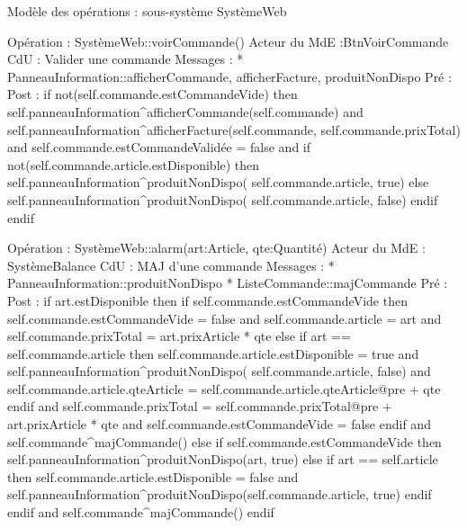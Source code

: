 ﻿Modèle des opérations : sous-système SystèmeWeb






Opération : SystèmeWeb::voirCommande()
Acteur du MdE :BtnVoirCommande
CdU : Valider une commande
Messages : 
* PanneauInformation::{afficherCommande, afficherFacture, produitNonDispo}
Pré :
Post : 
        if not(self.commande.estCommandeVide) then
                self.panneauInformation^afficherCommande(self.commande) 
                and
                self.panneauInformation^afficherFacture(self.commande, self.commande.prixTotal) 
                and
                self.commande.estCommandeValidée = false 
                and
                if not(self.commande.article.estDisponible) then
                        self.panneauInformation^produitNonDispo( self.commande.article, true)
                else
                        self.panneauInformation^produitNonDispo( self.commande.article, false)
                endif
        endif



Opération : SystèmeWeb::alarm(art:Article, qte:Quantité)
Acteur du MdE : SystèmeBalance
CdU : MAJ d’une commande
Messages :
* PanneauInformation::{produitNonDispo} 
* ListeCommande::{majCommande}
Pré :
Post :  
        if art.estDisponible then
                if self.commande.estCommandeVide then
                        self.commande.estCommandeVide = false 
                        and
                        self.commande.article = art 
                        and
                        self.commande.prixTotal = art.prixArticle * qte
                else
                        if art == self.commande.article then 
                                self.commande.article.estDisponible = true 
                                and 
                                self.panneauInformation^produitNonDispo( self.commande.article, false) 
                                and
                                self.commande.article.qteArticle = self.commande.article.qteArticle@pre + qte
                        endif
                        and
                        self.commande.prixTotal = self.commande.prixTotal@pre + art.prixArticle * qte
                        and
                        self.commande.estCommandeVide = false
                endif
                and
                self.commande^majCommande()
        else
                if self.commande.estCommandeVide then
                        self.panneauInformation^produitNonDispo(art, true)
                else
                        if art == self.article then 
                                self.commande.article.estDisponible = false 
                                and
                                self.panneauInformation^produitNonDispo(self.commande.article, true)
                        endif
                endif
                and
                self.commande^majCommande()
        endif
        


